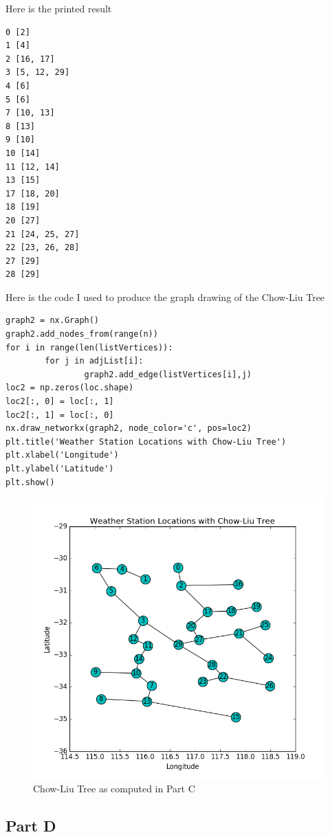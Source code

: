 \documentclass[twoside,11pt]{article}
\theoremstyle{definition}
\begin{document}
Here is the printed result
\begin{lstlisting}
0 [2]
1 [4]
2 [16, 17]
3 [5, 12, 29]
4 [6]
5 [6]
7 [10, 13]
8 [13]
9 [10]
10 [14]
11 [12, 14]
13 [15]
17 [18, 20]
18 [19]
20 [27]
21 [24, 25, 27]
22 [23, 26, 28]
27 [29]
28 [29]
\end{lstlisting}
\newpage
Here is the code I used to produce the graph drawing of the Chow-Liu Tree
\begin{lstlisting}
graph2 = nx.Graph()
graph2.add_nodes_from(range(n))
for i in range(len(listVertices)):
		for j in adjList[i]:
				graph2.add_edge(listVertices[i],j)
loc2 = np.zeros(loc.shape)
loc2[:, 0] = loc[:, 1]
loc2[:, 1] = loc[:, 0]
nx.draw_networkx(graph2, node_color='c', pos=loc2)
plt.title('Weather Station Locations with Chow-Liu Tree')
plt.xlabel('Longitude')
plt.ylabel('Latitude')
plt.show()
\end{lstlisting}

\begin{figure}[h]
\centering
\includegraphics[width=6in]{chowLiuTreeFigure2.png}
\caption{Chow-Liu Tree as computed in Part C}
\end{figure}

\subsection*{Part D}
\end{document}
